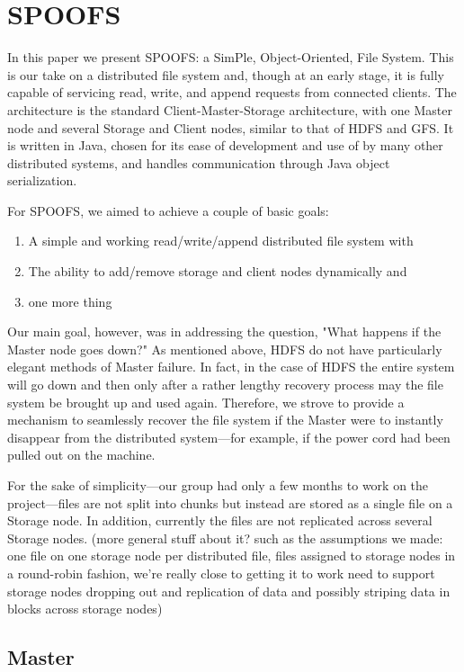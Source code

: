 \section{SPOOFS}

In this paper we present SPOOFS: a SimPle, Object-Oriented, File System. This is our take on a distributed file system and, though at an early stage, it is fully capable of servicing read, write, and append requests from connected clients. The architecture is the standard Client-Master-Storage architecture, with one Master node and several Storage and Client nodes, similar to that of HDFS and GFS. It is written in Java, chosen for its ease of development and use of by many other distributed systems, and handles communication through Java object serialization.

For SPOOFS, we aimed to achieve a couple of basic goals:
\begin{enumerate}
\item A simple and working read/write/append distributed file system with
\item The ability to add/remove storage and client nodes dynamically and
\item one more thing
\end{enumerate}
Our main goal, however, was in addressing the question, "What happens if the Master node goes down?" As mentioned above, HDFS  do not have particularly elegant methods of Master failure. In fact, in the case of HDFS the entire system will go down and then only after a rather lengthy recovery process may the file system be brought up and used again. Therefore, we strove to provide a mechanism to seamlessly recover the file system if the Master were to instantly disappear from the distributed system---for example, if the power cord had been pulled out on the machine.

For the sake of simplicity---our group had only a few months to work on the project---files are not split into chunks but instead are stored as a single file on a Storage node. In addition, currently the files are not replicated across several Storage nodes. (more general stuff about it? such as the assumptions we made: one file on one storage node per distributed file, files assigned to storage nodes in a round-robin fashion, we're really close to getting it to work need to support storage nodes dropping out and replication of data and possibly striping data in blocks across storage nodes)

\subsection{Master}


